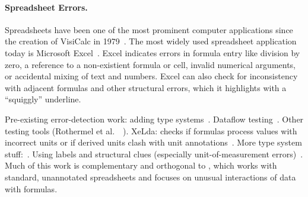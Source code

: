 \paragraph{Spreadsheet Errors.}
Spreadsheets have been one of the most prominent computer applications
since the creation of VisiCalc in 1979~\cite{FIXME}. The most widely
used spreadsheet application today is Microsoft Excel~\cite{}. Excel
indicates errors in formula entry like division by zero, a reference
to a non-existient formula or cell, invalid numerical arguments, or
accidental mixing of text and numbers.
Excel can also check for inconsistency with adjacent formulas and other structural errors, which it
highlights with a ``squiggly'' underline.

Pre-existing error-detection work: adding type
systems~\cite{DBLP:conf/kbse/AhmadAGK03}. Dataflow
testing~\cite{fisher2006scaling}. Other testing tools (Rothermel et
al.\
~\cite{rothermel1998you,rothermel2001methodology,Carver:2006:EET:1159733.1159775}). XeLda:
checks if formulas process values with incorrect units or if derived
units clash with unit
annotations~\cite{Antoniu:2004:VUC:998675.999448}.  More type system
stuff:~\cite{Erwig:2005:AGM:1062455.1062494}. Using labels and
structural clues (especially unit-of-measurement
errors)~\cite{Chambers:2010:RSL:1860134.1860346}. Much of this work is
complementary and orthogonal to \checkcell{}, which works with
standard, unannotated spreadsheets and focuses on unusual interactions of
data with formulas.


